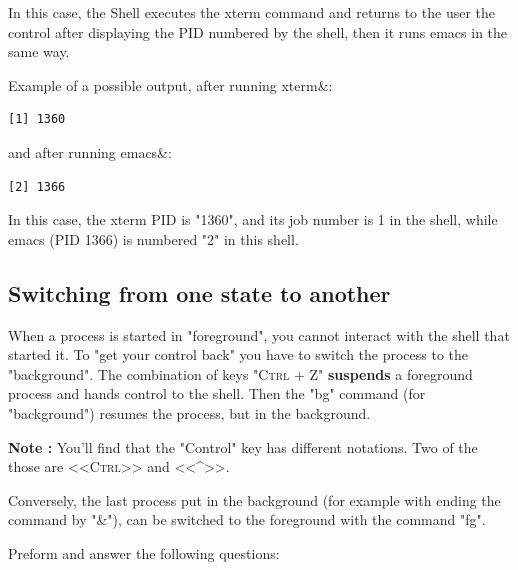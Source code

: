 \documentclass[11pt]{article}
\begin{document}
In this case, the Shell executes the xterm command and returns to the user the control after displaying the PID numbered by the shell, then it runs  emacs in the same way.

Example of a possible output, after running xterm\&:

\begin{lstlisting}
[1] 1360
\end{lstlisting}

and after running emacs\&:

\begin{lstlisting}
[2] 1366
\end{lstlisting}
In this case, the xterm PID is "1360", and its job number is 1 in the shell, while emacs (PID 1366) is numbered "2" in this shell.

\subsection{Switching from one state to another}

When a process is started in "foreground", you cannot interact with the shell that started it.
To "get your control back" you have to switch the process to the "background".
The combination of keys \textsc{"Ctrl + Z"} \textbf{suspends} a foreground process and hands control to the shell. Then the "bg" command (for "background") resumes the process, but in the background.

\textbf{Note :} You'll find that the "Control" key has different notations. Two of the those are <<\textsc{Ctrl}>> and <<\^{}>>.
\smallskip

Conversely, the last process put in the background (for example with ending the command by "\&"), can be switched to the foreground with the command "fg". 

\smallskip
\noindent Preform and answer the following questions:
\end{document}
